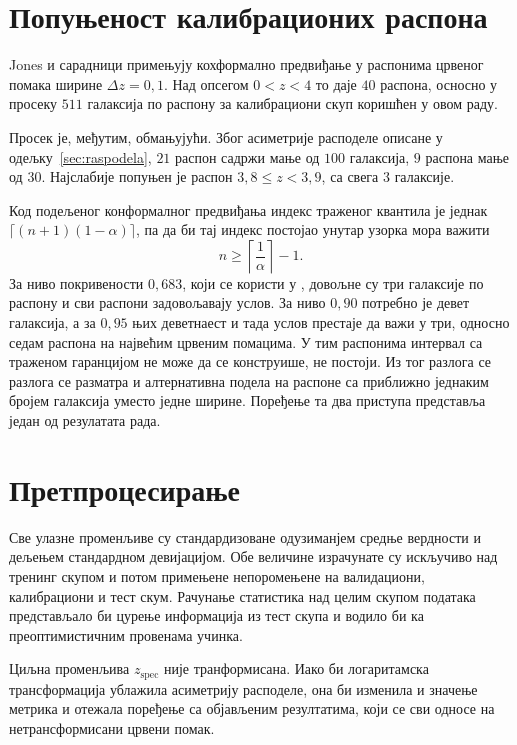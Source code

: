 \documentclass[12pt,oneside]{memoir}
\newcommand{\zspec}{z_{\mathrm{spec}}}
\begin{document}
\section{Попуњеност калибрационих распона}

Jones и сарадници \cite{jones2024b} примењују кохформално предвиђање у распонима црвеног помака 
ширине  $\Delta z = 0{,}1$. Над опсегом  $0 < z < 4$ то даје $40$ распона, осносно у просеку  $511$ галаксија по распону 
за калибрациони скуп коришћен у овом раду.

Просек је, међутим, обмањујући. Због асиметрије расподеле описане у 
одељку~\ref{sec:raspodela}, $21$ распон садржи мање од $100$ галаксија,
$9$ распона мање од $30$. Најслабије попуњен је распон $3{,}8 \le z < 3{,}9$, са свега 3 галаксије.

Код подељеног конформалног предвиђања индекс траженог квантила је једнак $\lceil (n+1)(1-\alpha) \rceil$, 
па да би тај индекс постојао унутар узорка мора важити
%
\begin{equation}
  n \ge \left\lceil \frac{1}{\alpha} \right\rceil - 1 .
  \label{eq:min-n}
\end{equation}
%
За ниво покривености $0{,}683$, који се користи у \cite{jones2024b}, 
довољне су три галаксије по распону и сви распони задовољавају услов. За 
ниво $0{,}90$ потребно је девет галаксија, а за $0{,}95$ њих деветнаест и тада
услов престаје да важи у три, односно  седам распона на највећим црвеним помацима. 
У тим распонима интервал са траженом гаранцијом не може да се конструише, не постоји.
Из тог разлога се разлога се разматра и алтернативна подела на распоне са приближно 
једнаким бројем галаксија уместо једне ширине. Поређење та два приступа 
представља један од резулатата рада.

\section{Претпроцесирање}

Све улазне променљиве су стандардизоване одузиманјем средње вердности и дељењем 
стандардном девијацијом. Обе величине израчунате су искључиво над тренинг скупом и 
потом примењене непоромењене на валидациони, калибрациони и тест скум. Рачунање статистика над целим скупом података 
представљало би цурење информација из тест скупа и водило би ка 
преоптимистичним провенама учинка.

Циљна променљива $\zspec$ није транформисана. Иако би логаритамска трансформација ублажила
асиметрију расподеле, она би изменила и значење метрика и отежала поређење са објављеним резултатима,
који се сви односе на нетрансформисани црвени помак.
\end{document}
